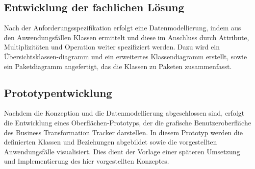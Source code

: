 \subsection{Entwicklung der fachlichen Lösung}
Nach der Anforderungsspezifikation erfolgt eine Datenmodellierung, indem aus den Anwendungsfällen Klassen ermittelt und diese im Anschluss durch Attribute, Multiplizitäten und Operation weiter spezifiziert werden. Dazu wird ein Übersichtsklassen-diagramm und ein erweitertes Klassendiagramm erstellt, sowie ein Paketdiagramm angefertigt, das die Klassen zu Paketen zusammenfasst.

\subsection{Prototypentwicklung}
Nachdem die Konzeption und die Datenmodellierung abgeschlossen sind, erfolgt die Entwicklung eines Oberflächen-Prototyps, der die grafische Benutzeroberfläche des Business Transformation Tracker darstellen. In diesem Prototyp werden die definierten Klassen und Beziehungen abgebildet sowie die vorgestellten Anwendungsfälle visualisiert. Dies dient der Vorlage einer späteren Umsetzung und Implementierung des hier vorgestellten Konzeptes. 